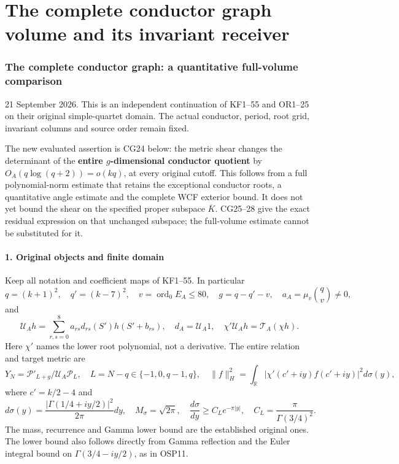\documentclass[11pt]{article}
\begin{document}
\clearpage\part{The complete conductor graph volume and its invariant receiver}
\label{part:5}
\section{The complete conductor graph: a quantitative full-volume comparison}\label{the-complete-conductor-graph-a-quantitative-full-volume-comparison}

21 September 2026. This is an independent continuation of KF1--55 and OR1--25 on their original simple-quartet domain. The actual conductor, period, root grid, invariant columns and source order remain fixed.

The new evaluated assertion is CG24 below: the metric shear changes the determinant of the \textbf{entire \(g\)-dimensional conductor quotient} by \(O_A(q\log(q+2))=o(kq)\), at every original cutoff. This follows from a full polynomial-norm estimate that retains the exceptional conductor roots, a quantitative angle estimate and the complete WCF exterior bound. It does not yet bound the shear on the specified proper subspace \(\overline K\). CG25--28 give the exact residual expression on that unchanged subspace; the full-volume estimate cannot be substituted for it.

\subsection{1. Original objects and finite domain}\label{original-objects-and-finite-domain}

Keep all notation and coefficient maps of KF1--55. In particular \[
q=(k+1)^2,\quad q'=(k-7)^2,\quad
v=\operatorname{ord}_0E_A\le80,\quad
g=q-q'-v,\quad a_A=\mu_v\binom qv\ne0,
\tag{CG1}
\] and \[
\mathcal U_Ah=\sum_{r,s=0}^8a_{rs}d_{rs}(S')h(S'+b_{rs}),
\quad d_A=\mathcal U_A1,\quad
\chi'\mathcal U_Ah=\mathcal T_A(\chi h).
\tag{CG2}
\] Here \(\chi'\) names the lower root polynomial, not a derivative. The entire relation and target metric are \[
Y_N=\mathcal P'_{L+g}/\mathcal U_A\mathcal P_L,
\quad L=N-q\in\{-1,0,q-1,q\},
\quad\|f\|_H^2=\int_{\mathbb R}|\chi'(c'+iy)f(c'+iy)|^2d\sigma(y),
\tag{CG3}
\] where \(c'=k/2-4\) and \[
d\sigma(y)=\frac{|\Gamma(1/4+iy/2)|^2}{2\pi}dy,
\quad M_\sigma=\sqrt{2\pi},
\quad \frac{d\sigma}{dy}\ge C_Le^{-\pi|y|},
\quad C_L=\frac\pi{\Gamma(3/4)^2}.
\tag{CG4}
\] The mass, recurrence and Gamma lower bound are the established original ones. The lower bound also follows directly from Gamma reflection and the Euler integral bound on \(\Gamma(3/4-iy/2)\), as in OSP11.
\end{document}
